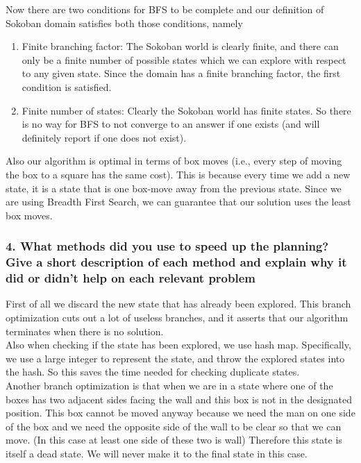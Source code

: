 \documentclass[10pt, letter]{article}
\begin{document}
Now there are two conditions for BFS to be complete \cite{cormen1996} and our definition of Sokoban domain satisfies both those conditions, namely
\begin{enumerate}
	\item Finite branching factor: The Sokoban world is clearly finite, and there can only be a finite number of possible states which we can explore with respect to any given state. Since the domain has a finite branching factor, the first condition is satisfied.
	\item Finite number of states: Clearly the Sokoban world has finite states. So there is no way for BFS to not converge to an answer if one exists (and will definitely report if one does not exist).
\end{enumerate}

Also our algorithm is optimal in terms of box moves (i.e., every step of moving the box to a square has the same cost). 
This is because every time we add a new state, it is a state that is one box-move away from the previous state.
Since we are using Breadth First Search, we can guarantee that our solution uses the least box moves.

\subsubsection*{4. What methods did you use to speed up the planning? Give a short description of each method
and explain why it did or didn't help on each relevant problem}
First of all we discard the new state that has already been explored.
This branch optimization cuts out a lot of useless branches, and it asserts that our algorithm terminates when there is no solution.
\\Also when checking if the state has been explored, we use hash map. 
Specifically, we use a large integer to represent the state, and throw the explored states into the hash.
So this saves the time needed for checking duplicate states.
\\Another branch optimization is that when we are in a state where one of the boxes has two adjacent sides facing the wall and this box is not in the designated position.
This box cannot be moved anyway because we need the man on one side of the box and we need the opposite side of the wall to be clear so that we can move. (In this case at least one side of these two is wall)
Therefore this state is itself a dead state. 
We will never make it to the final state in this case.

\end{document}
